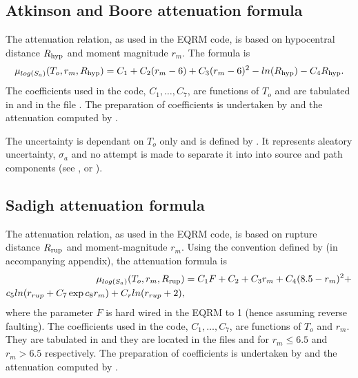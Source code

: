 \subsection{Atkinson and Boore attenuation formula}

The \cite{dr_Atkinson97a} attenuation relation, as used in the
EQRM code, is based on hypocentral distance $\Rhyp$ and moment
magnitude $r_m$. The formula is
\begin{equation}
\mu_{log(S_a)}(T_o,r_m,\Rhyp) = C_1 + C_2(r_m-6) + C_3(r_m-6)^2
-ln(\Rhyp)-C_4\Rhyp.
\end{equation}
The coefficients used in the code, $C_1,\ldots,C_7$, are functions
of $T_o$ and are tabulated in \citet[Table 1]{dr_Atkinson97a} and
in the file . The
preparation of coefficients is undertaken by
 and the attenuation
computed by .

The uncertainty is dependant on $T_o$ only and is defined by
\citet{dr_Atkinson95b}. It represents aleatory uncertainty,
$\sigma_a$ and no attempt is made to separate it into into source
and path components (see \citealt[Table 2]{dr_Atkinson95b}, or
).


\subsection{Sadigh attenuation formula}

The \cite{dr_Sadigh97a} attenuation relation, as used in the EQRM
code, is based on rupture distance $\Rrup$ and moment-magnitude
$r_m$. Using the convention defined by \citet{dr_Campbell03a} (in
accompanying appendix), the attenuation formula is
\begin{equation}
\begin{split}
\mu_{log(S_a)}(T_o,r_m,\Rrup) & = C_1F +C_2 + C_3r_m
+C_4(8.5-r_m)^2 + \\ c_5ln(r_{rup}+C_7\exp{c_8r_m}) +
C_rln(r_{rup}+2),
\end{split}
\end{equation}
where the parameter $F$ is hard wired in the EQRM to 1 (hence
assuming reverse faulting). The coefficients used in the code,
$C_1,\ldots,C_7$, are functions of $T_o$ and $ r_m$. They are
tabulated in \citet[Table 2]{dr_Sadigh97a} and they are located in
the files
 and
 for
\mbox{$r_m \leq 6.5$} and \mbox{$r_m > 6.5$} respectively. The
preparation of coefficients is undertaken by
 and the attenuation
computed by .

